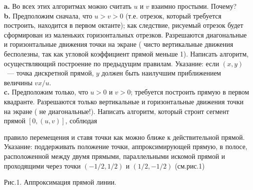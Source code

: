 \hspace*{15pt}\textbf{a.} Во всех этих алгоритмах можно считать $u$ и $v$ взаимно простыми. Почему?\newline
\\
\hspace*{15pt}\textbf{b.} Предположим сначала, что $u>v>0$ (т.е. отрезок, который требуется построить, находится в первом октанте); как следствие, рисуемый отрезок будет сформирован из маленьких горизонтальных отрезков. Разрешаются диагональные и горизонтальные движения точки на экране ( чисто вертикальные движения бесполезны, так как угловой коэффициент прямой меньше 1). Написать алгоритм, осуществляющий построение по предыдущим правилам. Указание: если $\left({x,y}\right)$ ~--- точка дискретной прямой, $y$ должен быть наилучшим приближением величины $vx/u$. \newline
\\
\hspace*{15pt}\textbf{c.} Предположим только, что $u>0$ и $v>0$; требуется построить прямую в первом квадранте. Разрешаются только вертикальные и горизонтальные движения точки на экране ( не диагональные!). Написать алгоритм, который строит сегмент прямой $\left[{0,\left({u,v}\right)}\right]$, соблюдая \newline

\newpage

\noindent правило перемещения и ставя точки как можно ближе к действительной прямой. Указание: поддерживать положение точки, аппроксимирующей прямую, в полосе, расположенной между двумя прямыми, параллельными искомой прямой и проходящими через точки $\left({-1/2,1/2}\right)$ и $\left({1/2,-1/2}\right)$ (см.рис.1) 

\begin{center}
\end{center}
\begin{center}
Рис.1. Аппроксимация прямой линии. 
\end{center}

